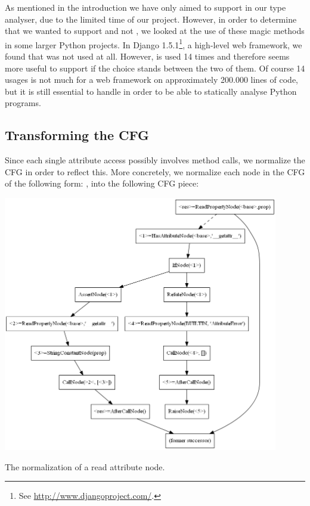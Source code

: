 As mentioned in the introduction we have only aimed to support  in our type analyser, due to the limited time of our project. However, in order to determine that we wanted to support  and not , we looked at the use of these magic methods in some larger Python projects. In Django 1.5.1\footnote{See \url{http://www.djangoproject.com/}.}, a high-level web framework, we found that  was not used at all. However,  is used 14 times and therefore seems more useful to support if the choice stands between the two of them. Of course 14 usages is not much for a web framework on approximately 200.000 lines of code, but it is still essential to handle in order to be able to statically analyse Python programs.

\subsection{Transforming the CFG}
\label{Magic methods transformation}
Since each single attribute access possibly involves method calls, we normalize the CFG in order to reflect this. More concretely, we normalize each node in the CFG of the following form: , into the following CFG piece:

\begin{listing}[H]
  \begin{center}
    \includegraphics[width=0.9\textwidth]{images/readproperty.png}
  \end{center}
  \vspace{-10pt}
  \caption{The normalization of a read attribute node.}
  \label{fig:MagicMethods1}
\end{listing}

